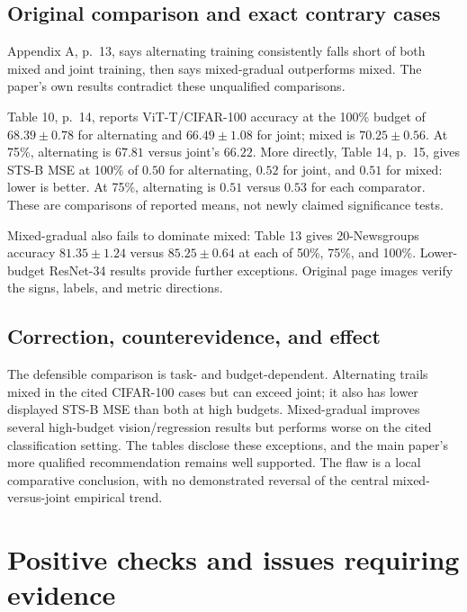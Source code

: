\documentclass[10pt]{article}
\begin{document}
\subsection*{Original comparison and exact contrary cases}
Appendix A, p. 13, says alternating training consistently falls short of both mixed and joint training, then says mixed-gradual outperforms mixed. The paper’s own results contradict these unqualified comparisons.\par
Table 10, p. 14, reports ViT-T/CIFAR-100 accuracy at the 100\% budget of \(68.39\pm0.78\) for alternating and \(66.49\pm1.08\) for joint; mixed is \(70.25\pm0.56\). At 75\%, alternating is \(67.81\) versus joint’s \(66.22\). More directly, Table 14, p. 15, gives STS-B MSE at 100\% of \(0.50\) for alternating, \(0.52\) for joint, and \(0.51\) for mixed: lower is better. At 75\%, alternating is \(0.51\) versus \(0.53\) for each comparator. These are comparisons of reported means, not newly claimed significance tests.\par
Mixed-gradual also fails to dominate mixed: Table 13 gives 20-Newsgroups accuracy \(81.35\pm1.24\) versus \(85.25\pm0.64\) at each of 50\%, 75\%, and 100\%. Lower-budget ResNet-34 results provide further exceptions. Original page images verify the signs, labels, and metric directions.\par
\subsection*{Correction, counterevidence, and effect}
The defensible comparison is task- and budget-dependent. Alternating trails mixed in the cited CIFAR-100 cases but can exceed joint; it also has lower displayed STS-B MSE than both at high budgets. Mixed-gradual improves several high-budget vision/regression results but performs worse on the cited classification setting. The tables disclose these exceptions, and the main paper’s more qualified recommendation remains well supported. The flaw is a local comparative conclusion, with no demonstrated reversal of the central mixed-versus-joint empirical trend.\par
\section*{Positive checks and issues requiring evidence}
\end{document}
